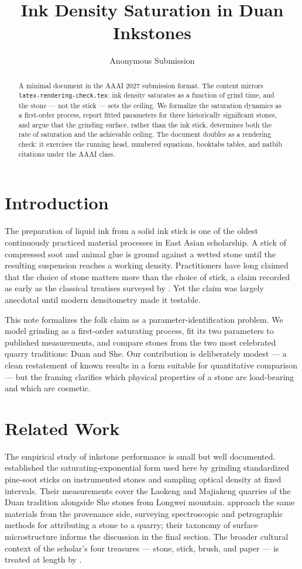 \documentclass[letterpaper]{article} %
\title{Ink Density Saturation in Duan Inkstones}
\author{
    Anonymous Submission
}
\begin{document}
\maketitle

\begin{abstract}
A minimal document in the AAAI 2027 submission format. The content
mirrors \texttt{latex-rendering-check.tex}: ink density saturates as a
function of grind time, and the stone --- not the stick --- sets the
ceiling. We formalize the saturation dynamics as a first-order process,
report fitted parameters for three historically significant stones, and
argue that the grinding surface, rather than the ink stick, determines
both the rate of saturation and the achievable ceiling. The document
doubles as a rendering check: it exercises the running head, numbered
equations, booktabs tables, and natbib citations under the AAAI class.
\end{abstract}

\section{Introduction}

The preparation of liquid ink from a solid ink stick is one of the
oldest continuously practiced material processes in East Asian
scholarship. A stick of compressed soot and animal glue is ground
against a wetted stone until the resulting suspension reaches a working
density. Practitioners have long claimed that the choice of stone
matters more than the choice of stick, a claim recorded as early as the
classical treatises surveyed by \citet{mizuta1968}. Yet the claim was
largely anecdotal until modern densitometry made it testable.

This note formalizes the folk claim as a parameter-identification
problem. We model grinding as a first-order saturating process, fit its
two parameters to published measurements, and compare stones from the
two most celebrated quarry traditions: Duan and She. Our contribution
is deliberately modest --- a clean restatement of known results in a
form suitable for quantitative comparison --- but the framing clarifies
which physical properties of a stone are load-bearing and which are
cosmetic.

\section{Related Work}

The empirical study of inkstone performance is small but well
documented. \citet{tanaka2019} established the saturating-exponential
form used here by grinding standardized pine-soot sticks on
instrumented stones and sampling optical density at fixed intervals.
Their measurements cover the Laokeng and Majiakeng quarries of the Duan
tradition alongside She stones from Longwei mountain.
\citet{chen2021} approach the same materials from the provenance side,
surveying spectroscopic and petrographic methods for attributing a
stone to a quarry; their taxonomy of surface microstructure informs the
discussion in the final section. The broader cultural context of the
scholar's four treasures --- stone, stick, brush, and paper --- is
treated at length by \citet{mizuta1968}.
\end{document}
